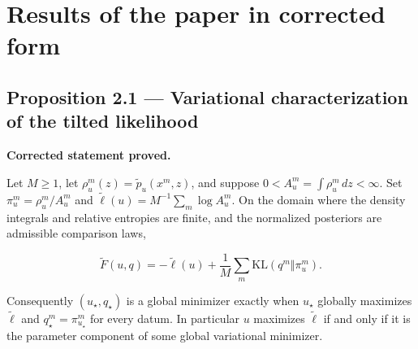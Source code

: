 \documentclass[11pt,a4paper]{report}
\providecommand{\lt}{<}
\begin{document}
\section{Results of the paper in corrected form}
\subsection{\texorpdfstring{Proposition 2.1 — Variational characterization of the tilted likelihood}{Proposition 2.1 — Variational characterization of the tilted likelihood}}


\textbf{Corrected statement proved.}



Let \(M\ge1\), let \(\rho_u^m(z)=\widetilde p_u(x^m,z)\),
        and suppose \(0\lt A_u^m=\int\rho_u^m\,dz\lt\infty\). Set
        \(\pi_u^m=\rho_u^m/A_u^m\) and
        \(\widetilde\ell(u)=M^{-1}\sum_m\log A_u^m\). On the domain where the
        density integrals and relative entropies are finite, and the normalized
        posteriors are admissible comparison laws,


        \[\widetilde F(u,q)=-\widetilde\ell(u)
          +\frac1M\sum_m\mathrm{KL}(q^m\Vert\pi_u^m).\]


Consequently \((u_\star,q_\star)\) is a global minimizer exactly when
        \(u_\star\) globally maximizes \(\widetilde\ell\) and
        \(q_\star^m=\pi_{u_\star}^m\) for every datum. In particular \(u\)
        maximizes \(\widetilde\ell\) if and only if it is the parameter
        component of some global variational minimizer.
\end{document}
